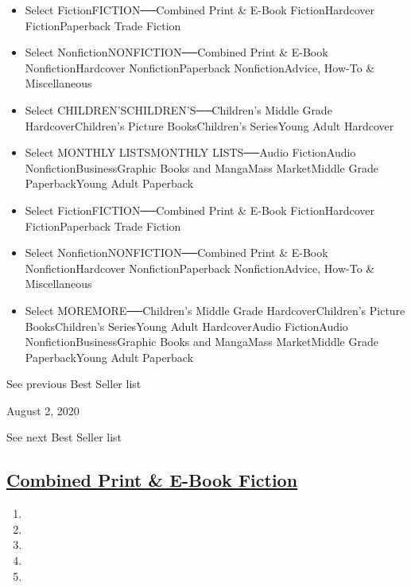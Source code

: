 \begin{itemize}
\tightlist
\item
  Select FictionFICTION──Combined Print \& E-Book FictionHardcover
  FictionPaperback Trade Fiction
\item
  Select NonfictionNONFICTION──Combined Print \& E-Book
  NonfictionHardcover NonfictionPaperback NonfictionAdvice, How-To \&
  Miscellaneous
\item
  Select CHILDREN'SCHILDREN'S──Children's Middle Grade
  HardcoverChildren's Picture BooksChildren's SeriesYoung Adult
  Hardcover
\item
  Select MONTHLY LISTSMONTHLY LISTS──Audio FictionAudio
  NonfictionBusinessGraphic Books and MangaMass MarketMiddle Grade
  PaperbackYoung Adult Paperback
\end{itemize}

\begin{itemize}
\tightlist
\item
  Select FictionFICTION──Combined Print \& E-Book FictionHardcover
  FictionPaperback Trade Fiction
\item
  Select NonfictionNONFICTION──Combined Print \& E-Book
  NonfictionHardcover NonfictionPaperback NonfictionAdvice, How-To \&
  Miscellaneous
\item
  Select MOREMORE──Children's Middle Grade HardcoverChildren's Picture
  BooksChildren's SeriesYoung Adult HardcoverAudio FictionAudio
  NonfictionBusinessGraphic Books and MangaMass MarketMiddle Grade
  PaperbackYoung Adult Paperback
\end{itemize}

\href{/books/best-sellers/2020/07/26/}{}

See previous Best Seller list

August 2, 2020\href{/books/best-sellers/2020/08/09/}{}

See next Best Seller list

\hypertarget{combined-print--e-book-fiction}{%
\subsection{\texorpdfstring{\href{/books/best-sellers/2020/08/02/combined-print-and-e-book-fiction/}{Combined
Print \& E-Book
Fiction}}{Combined Print \& E-Book Fiction}}\label{combined-print--e-book-fiction}}

\begin{enumerate}
\def\labelenumi{\arabic{enumi}.}
\tightlist
\item
\item
\item
\item
\item
\end{enumerate}

